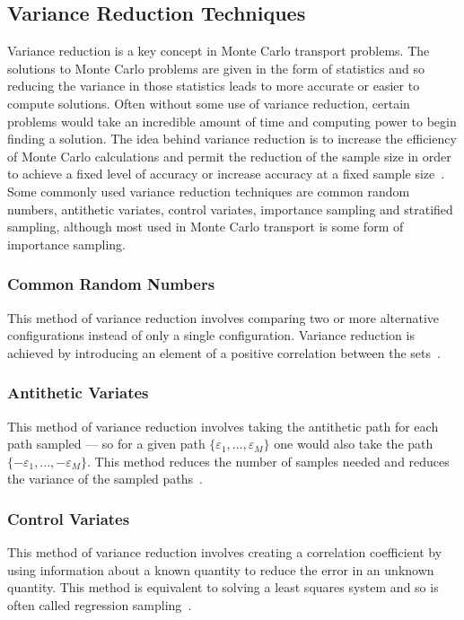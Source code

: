 \subsection{ \textbf{Variance Reduction Techniques} }

Variance reduction is a key concept in Monte Carlo transport problems.
%
The solutions to Monte Carlo problems are given in the form of statistics and so reducing the variance in those statistics leads to more accurate or easier to compute solutions.
%
Often without some use of variance reduction, certain problems would take an incredible amount of time and computing power to begin finding a solution.
%
The idea behind variance reduction is to increase the efficiency of Monte Carlo calculations and permit the reduction of the sample size in order to achieve a fixed level of accuracy or increase accuracy at a fixed sample size~\cite{kahn1953methods}.
%
Some commonly used variance reduction techniques are common random numbers, antithetic variates, control variates, importance sampling and stratified sampling, although most used in Monte Carlo transport is some form of importance sampling.
%

\subsubsection*{\textbf{Common Random Numbers}} This method of variance reduction involves comparing two or more alternative configurations instead of only a single configuration. Variance reduction is achieved by introducing an element of a positive correlation between the sets~\cite{wikipediaVarReduction}.

\subsubsection*{\textbf{Antithetic Variates}} This method of variance reduction involves taking the antithetic path for each path sampled --- so for a given path $ \{ \varepsilon_1, ..., \varepsilon_M \}$ one would also take the path $ \{ -\varepsilon_1, ... , -\varepsilon_M  \} $. This method reduces the number of samples needed and reduces the variance of the sampled paths~\cite{wikipediaAntitheticVaraites}.

\subsubsection*{\textbf{Control Variates}} This method of variance reduction involves creating a correlation coefficient by using information about a known quantity to reduce the error in an unknown quantity. This method is equivalent to solving a least squares system and so is often called regression sampling~\cite{wikipediaControlVaraites}.

